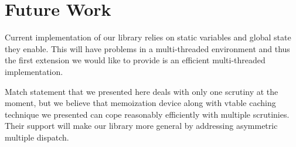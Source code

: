 \documentclass[preprint]{sigplanconf}
\begin{document}

\section{Future Work} %
\label{sec:fw}

Current implementation of our library relies on static variables and global 
state they enable. This will have problems in a multi-threaded environment and 
thus the first extension we would like to provide is an efficient multi-threaded 
implementation.

Match statement that we presented here deals with only one scrutiny at the 
moment, but we believe that memoization device along with vtable caching 
technique we presented can cope reasonably efficiently with multiple scrutinies. 
Their support will make our library more general by addressing asymmetric 
multiple dispatch.
\end{document}
